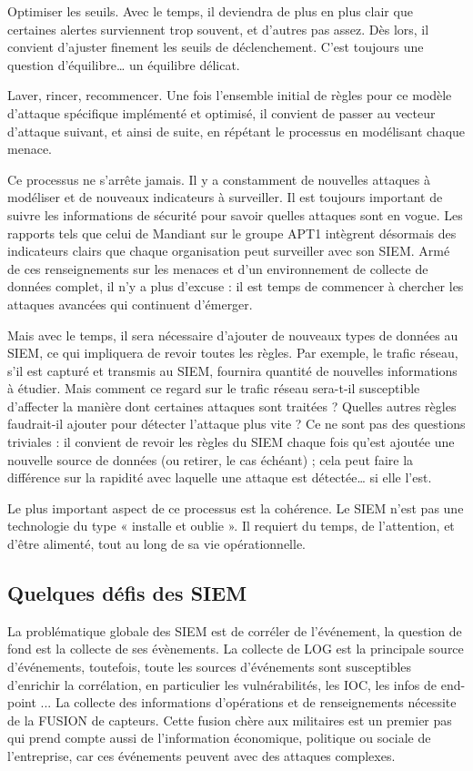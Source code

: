 Optimiser les seuils. Avec le temps, il deviendra de plus en plus clair que certaines alertes surviennent trop souvent, et d’autres pas assez. Dès lors, il convient d’ajuster finement les seuils de déclenchement. C’est toujours une question d’équilibre… un équilibre délicat.

Laver, rincer, recommencer. Une fois l’ensemble initial de règles pour ce modèle d’attaque spécifique implémenté et optimisé, il convient de passer au vecteur d’attaque suivant, et ainsi de suite, en répétant le processus en modélisant chaque menace.

Ce processus ne s’arrête jamais. Il y a constamment de nouvelles attaques à modéliser et de nouveaux indicateurs à surveiller. Il est toujours important de suivre les informations de sécurité pour savoir quelles attaques sont en vogue. Les rapports tels que celui de Mandiant sur le groupe APT1 intègrent désormais des indicateurs clairs que chaque organisation peut surveiller avec son SIEM. Armé de ces renseignements sur les menaces et d’un environnement de collecte de données complet, il n’y a plus d’excuse : il est temps de commencer à chercher les attaques avancées qui continuent d’émerger.

Mais avec le temps, il sera nécessaire d’ajouter de nouveaux types de données au SIEM, ce qui impliquera de revoir toutes les règles. Par exemple, le trafic réseau, s’il est capturé et transmis au SIEM, fournira quantité de nouvelles informations à étudier. Mais comment ce regard sur le trafic réseau sera-t-il susceptible d’affecter la manière dont certaines attaques sont traitées ? Quelles autres règles faudrait-il ajouter pour détecter l’attaque plus vite ? Ce ne sont pas des questions triviales : il convient de revoir les règles du SIEM chaque fois qu’est ajoutée une nouvelle source de données (ou retirer, le cas échéant) ; cela peut faire la différence sur la rapidité avec laquelle une attaque est détectée… si elle l’est.

Le plus important aspect de ce processus est la cohérence. Le SIEM n’est pas une technologie du type « installe et oublie ». Il requiert du temps, de l’attention, et d’être alimenté, tout au long de sa vie opérationnelle.



\subsection{Quelques défis des SIEM	}

La problématique globale des SIEM est de corréler de l'événement, la question de fond est la collecte de ses évènements. La collecte de LOG est la principale source d'événements, toutefois, toute les sources d'événements sont susceptibles d'enrichir la corrélation, en particulier les vulnérabilités, les IOC, les infos de end-point ...
La collecte des informations d'opérations et de renseignements nécessite de la FUSION de capteurs.  Cette fusion chère aux militaires est un premier pas qui prend compte aussi de l'information économique, politique ou sociale de l'entreprise, car ces événements peuvent  avec des attaques complexes.
  

